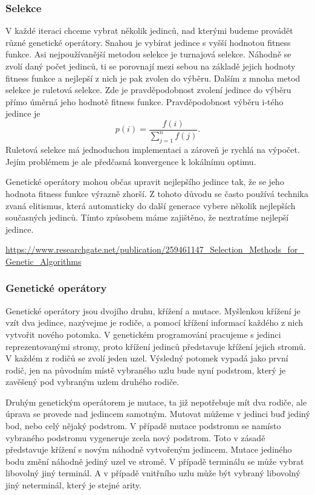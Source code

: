\subsubsection{Selekce}
V každé iteraci chceme vybrat několik jedinců, nad kterými budeme provádět různé genetické operátory. Snahou je vybírat jedince s vyšší hodnotou fitness funkce.
Asi nejpoužívanější metodou selekce je turnajová selekce. Náhodně se zvolí daný počet jedinců, ti se porovnají mezi sebou na základě jejich hodnoty fitness funkce a nejlepší z nich je pak zvolen do výběru.
Dalším z mnoha metod selekce je ruletová selekce. Zde je pravděpodobnost zvolení jedince do výběru přímo úměrná jeho hodnotě fitness funkce.
Pravděpodobnost výběru i-tého jedince je 
\[p(i) = \frac{f(i)}{\sum_{j=1}^{n} f(j)}. \]
Ruletová selekce má jednoduchou implementaci a zároveň je rychlá na výpočet. 
Jejím problémem je ale předčasná konvergence k lokálnímu optimu.
\par
Genetické operátory mohou občas upravit nejlepšího jedince tak, že se jeho hodnota fitness funkce výrazně zhorší.
Z tohoto důvodu se často používá technika zvaná elitismus, která automaticky do další generace vybere několik nejlepších současných jedinců. 
Tímto způsobem máme zajištěno, že neztratíme nejlepší jedince.

\url{https://www.researchgate.net/publication/259461147_Selection_Methods_for_Genetic_Algorithms}


\subsubsection{Genetické operátory}
Genetické operátory jsou dvojího druhu, křížení a mutace. Myšlenkou křížení je vzít dva jedince, nazývejme je rodiče, a pomocí křížení informací každého z nich vytvořit nového potomka.
V genetickém programování pracujeme s jedinci reprezentovanými stromy, proto křížení jedinců představuje křížení jejich stromů. V každém z rodičů se zvolí jeden uzel. 
Výsledný potomek vypadá jako první rodič, jen na původním místě vybraného uzlu bude nyní podstrom, který je zavěšený pod vybraným uzlem druhého rodiče.
\par
Druhým genetickým operátorem je mutace, ta již nepotřebuje mít dva rodiče, ale úprava se provede nad jedincem samotným.
Mutovat můžeme v jedinci buď jediný bod, nebo celý nějaký podstrom. V případě mutace podstromu se namísto vybraného podstromu vygeneruje zcela nový podstrom. 
Toto v zásadě představuje křížení s novým náhodně vytvořeným jedincem.
\newline
Mutace jediného bodu změní náhodně jediný uzel ve stromě. V případě terminálu se může vybrat libovolný jiný terminál. A v případě vnitřního uzlu může být vybraný libovolný jiný neterminál, který je stejné arity.


